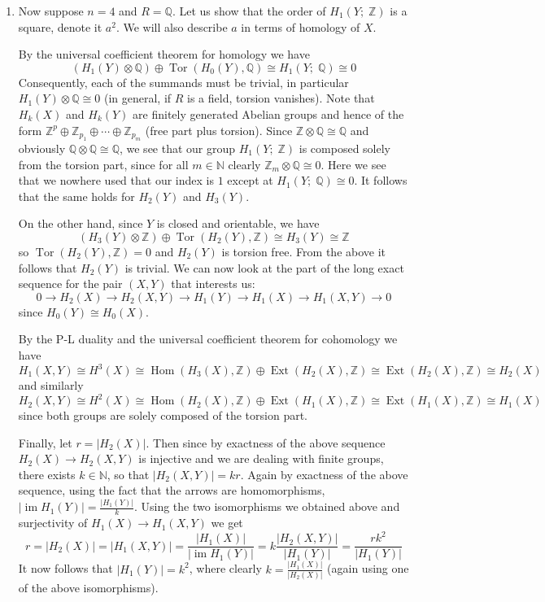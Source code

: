 \documentclass[a4paper, 12pt]{article}
\DeclareMathOperator{\im}{im}
\DeclareMathOperator{\Tor}{Tor}
\DeclareMathOperator{\Ext}{Ext}
\DeclareMathOperator{\Hom}{Hom}
\newcommand{\N}{\mathbb{N}}
\newcommand{\Z}{\mathbb{Z}}
\newcommand{\Q}{\mathbb{Q}}
\newcommand{\iso}{\cong}
\begin{document}
\begin{enumerate}[label=(\alph*)]
	\item Now suppose $n=4$ and $R = \Q$. Let us show that the order of $H_1(Y ; \; \Z)$ is a square, denote it $a^2$. We will also describe $a$ in terms of homology of $X$.
	
	By the universal coefficient theorem for homology we have
	\[
	(H_1(Y) \otimes \Q) \oplus \Tor(H_0(Y), \Q) \iso H_1(Y ; \; \Q) \iso 0
	\]
	Consequently, each of the summands must be trivial, in particular $H_1(Y) \otimes \Q \iso 0$ (in general, if $R$ is a field, torsion vanishes). Note that $H_k(X)$ and $H_k(Y)$ are finitely generated Abelian groups and hence of the form $\Z^p \oplus \Z_{p_1} \oplus \cdots \oplus \Z_{p_m}$ (free part plus torsion). Since $\Z \otimes \Q \iso \Q$ and obviously $\Q \otimes \Q \iso \Q$, we see that our group $H_1(Y ; \; \Z)$ is composed solely from the torsion part, since for all $m \in \N$ clearly $\Z_m \otimes \Q \iso 0$. Here we see that we nowhere used that our index is $1$ except at $H_1(Y; \; \Q) \iso 0$. It follows that the same holds for $H_2(Y)$ and $H_3(Y)$.
	
	On the other hand, since $Y$ is closed and orientable, we have
	\[
	(H_3(Y) \otimes \Z) \oplus \Tor(H_2(Y), \Z) \iso H_3(Y) \iso \Z
	\]
	so $\Tor(H_2(Y), \Z) = 0$ and $H_2(Y)$ is torsion free. From the above it follows that $H_2(Y)$ is trivial.
	We can now look at the part of the long exact sequence for the pair $(X,Y)$ that interests us:
	\[
	0 \xrightarrow{} H_2(X) \xrightarrow{} H_2(X, Y) \xrightarrow{} H_1(Y) \xrightarrow{} H_1(X) \xrightarrow{} H_1(X, Y) \xrightarrow{} 0
	\]
	since $H_0(Y) \iso H_0(X)$.
	
	By the P-L duality and the universal coefficient theorem for cohomology we have
	\[
	H_1(X, Y) \iso H^3(X) \iso \Hom(H_3(X), \Z) \oplus \Ext(H_2(X), \Z) \iso \Ext(H_2(X), \Z) \iso H_2(X)
	\]
	and similarly
	\[
	H_2(X, Y) \iso H^2(X) \iso \Hom(H_2(X), \Z) \oplus \Ext(H_1(X), \Z) \iso \Ext(H_1(X), \Z) \iso H_1(X)
	\]
	since both groups are solely composed of the torsion part.
	
	Finally, let $r = |H_2(X)|$. Then since by exactness of the above sequence $H_2(X) \to H_2(X, Y)$ is injective and we are dealing with finite groups, there exists $k \in \N$, so that $|H_2(X, Y)| = kr$. Again by exactness of the above sequence, using the fact that the arrows are homomorphisms, $|\im H_1(Y)| = \frac{|H_1(Y)|}{k}$. Using the two isomorphisms we obtained above and surjectivity of $H_1(X) \to H_1(X, Y)$ we get
	\[
	r = |H_2(X)| = |H_1(X, Y)| = \frac{|H_1(X)|}{|\im H_1(Y)|} = k \frac{|H_2(X, Y)|}{|H_1(Y)|} = \frac{rk^2}{|H_1(Y)|}
	\]
	It now follows that $|H_1(Y)| = k^2$, where clearly $k = \frac{|H_1(X)|}{|H_2(X)|}$ (again using one of the above isomorphisms).
\end{enumerate}
\end{document}
